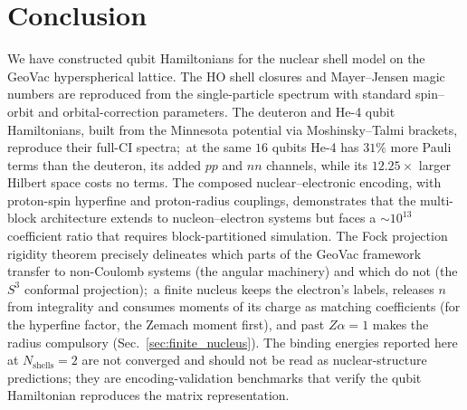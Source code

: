 \documentclass[twocolumn,prc,amsmath,amssymb,superscriptaddress]{revtex4-2}
\begin{document}
\section{Conclusion}
\label{sec:conclusion}

We have constructed qubit Hamiltonians for the nuclear shell model on
the GeoVac hyperspherical lattice. The HO shell closures and
Mayer--Jensen magic numbers are reproduced from the single-particle
spectrum with standard spin--orbit and orbital-correction parameters.
The deuteron and He-4 qubit Hamiltonians, built from the Minnesota
potential via Moshinsky--Talmi brackets, reproduce their full-CI
spectra;\ at the same $16$ qubits He-4 has $31\%$ more Pauli terms
than the deuteron, its added $pp$ and $nn$ channels, while its
$12.25\times$ larger Hilbert space costs no terms. The composed
nuclear--electronic encoding, with proton-spin hyperfine and proton-radius
couplings, demonstrates that the multi-block architecture extends to
nucleon--electron systems but faces a $\sim 10^{13}$ coefficient ratio that
requires block-partitioned simulation. The Fock projection rigidity
theorem precisely delineates which parts of the GeoVac framework
transfer to non-Coulomb systems (the angular machinery) and which do
not (the $S^3$ conformal projection);\ a finite nucleus keeps the electron's labels, releases $n$ from integrality and consumes moments of its charge as matching coefficients (for the hyperfine factor, the Zemach moment first), and past $Z\alpha = 1$ makes the radius compulsory (Sec.~\ref{sec:finite_nucleus}). The binding energies reported
here at $N_{\mathrm{shells}}=2$ are not converged and should not be
read as nuclear-structure predictions; they are encoding-validation
benchmarks that verify the qubit Hamiltonian reproduces the matrix
representation.
\end{document}

